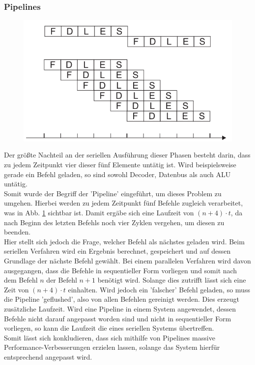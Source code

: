 \subsubsection{Pipelines}
\begin{figure}
\centering
\includegraphics[scale=0.5]{images/pipeline.png}
\label{pipeline}
\end{figure}
Der größte Nachteil an der seriellen Ausführung dieser Phasen besteht darin, dass zu jedem Zeitpunkt vier dieser fünf Elemente untätig ist. Wird beispielsweise gerade ein Befehl geladen, so sind sowohl Decoder, Datenbus als auch ALU untätig.\\
Somit wurde der Begriff der 'Pipeline' eingeführt, um dieses Problem zu umgehen. Hierbei werden zu jedem Zeitpunkt fünf Befehle zugleich verarbeitet, was in Abb. \ref{pipeline} sichtbar ist. Damit ergäbe sich eine Laufzeit von $(n+4) \cdot t$, da nach Beginn des letzten Befehls noch vier Zyklen vergehen, um diesen zu beenden.\\
Hier stellt sich jedoch die Frage, welcher Befehl als nächstes geladen wird. Beim seriellen Verfahren wird ein Ergebnis berechnet, gespeichert und auf dessen Grundlage der nächste Befehl gewählt. Bei einem parallelen Verfahren wird davon ausgegangen, dass die Befehle in sequentieller Form vorliegen und somit nach dem Befehl $n$ der Befehl $n+1$ benötigt wird. Solange dies zutrifft lässt sich eine Zeit von $(n+4) \cdot t$ einhalten. Wird jedoch ein 'falscher' Befehl geladen, so muss die Pipeline 'geflushed', also von allen Befehlen gereinigt werden. Dies erzeugt zusätzliche Laufzeit. Wird eine Pipeline in einem System angewendet, dessen Befehle nicht darauf angepasst worden sind und nicht in sequentieller Form vorliegen, so kann die Laufzeit die eines seriellen Systems übertreffen.\\
Somit lässt sich konkludieren, dass sich mithilfe von Pipelines massive Performance-Verbesserungen erzielen lassen, solange das System hierfür entsprechend angepasst wird.


